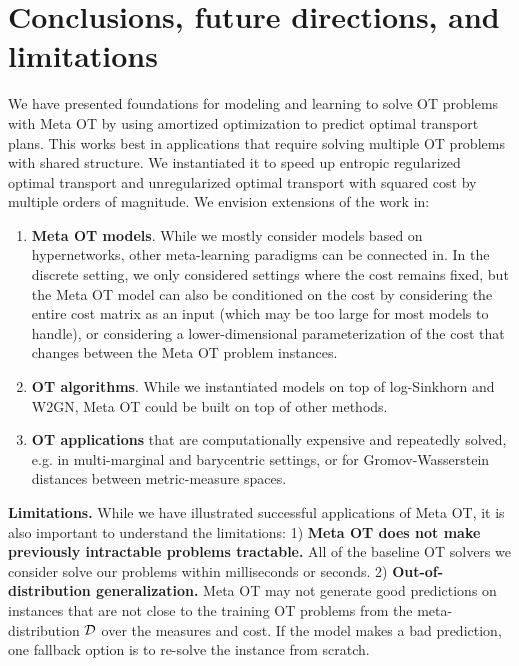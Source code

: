 \documentclass{article}
\newcommand{\eg}{e.g.\xspace}
\begin{document}
\section{Conclusions, future directions, and limitations}
\label{sec:con}
We have presented foundations for modeling and learning to
solve OT problems with Meta OT by using amortized optimization
to predict optimal transport plans.
This works best in applications that require solving
multiple OT problems with shared structure.
We instantiated it to speed up entropic regularized optimal
transport and unregularized optimal transport with squared
cost by multiple orders of magnitude.
We envision extensions of the work in:
\begin{enumerate}
\item \textbf{Meta OT models}.
While we mostly consider models based on hypernetworks,
other meta-learning paradigms can be connected in.
In the discrete setting, we only considered settings where
the cost remains fixed, but the Meta OT model can also be conditioned
on the cost by considering the entire cost matrix as an input
(which may be too large for most models to handle), or considering
a lower-dimensional parameterization of the cost that changes between
the Meta OT problem instances.
\item \textbf{OT algorithms}. While we instantiated
models on top of log-Sinkhorn and W2GN, Meta OT
could be built on top of other methods.
\item \textbf{OT applications} that are computationally
expensive and repeatedly solved, \eg in multi-marginal
and barycentric settings, or for Gromov-Wasserstein
distances between metric-measure spaces.
\end{enumerate}

\textbf{Limitations.}
While we have illustrated successful applications of Meta OT,
it is also important to understand the limitations:
1) \textbf{Meta OT does not make previously intractable
problems tractable.}
All of the baseline OT solvers we consider solve
our problems within milliseconds or seconds.
2) \textbf{Out-of-distribution generalization.}
Meta OT may not generate good predictions on instances
that are not close to the training OT problems from the
meta-distribution ${\mathcal{D}}$ over the measures and cost.
If the model makes a bad prediction,
one fallback option is to re-solve the instance from scratch.

\end{document}
